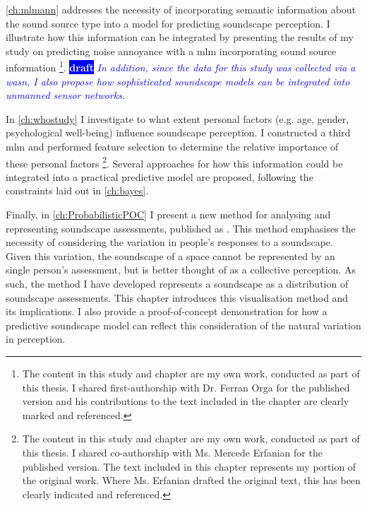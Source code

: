 \documentclass[twoside,fontsize=12pt,titlepage,chapterprefix=true
]{scrbook}
\newcommand{\remark}[3]{%
    {\colorbox{#2}{\sffamily\scriptsize\bfseries\textcolor{white}{#1}}}
    {\sffamily\small\itshape\textcolor{#2}{#3}}
}
\newcommand{\draft}[1]{\remark{draft}{blue}{#1}}
\begin{document}
\cref{ch:mlmann} addresses the necessity of incorporating semantic information about the sound source type into a model for predicting soundscape perception. I illustrate how this information can be integrated by presenting the results of my study on predicting noise annoyance with a \gls{mlm} incorporating sound source information \citep{Orga2021Multilevel}\footnote{The content in this study and chapter are my own work, conducted as part of this thesis. I shared first-authorship with Dr. Ferran Orga for the published version and his contributions to the text included in the chapter are clearly marked and referenced. }. \draft{In addition, since the data for this study was collected via a \gls{wasn}, I also propose how sophisticated soundscape models can be integrated into unmanned sensor networks.}

In \cref{ch:whostudy} I investigate to what extent personal factors (e.g. age, gender, psychological well-being) influence soundscape perception. I constructed a third \gls{mlm} and performed feature selection to determine the relative importance of these personal factors \citep{Erfanian2021Psychological}\footnote{The content in this study and chapter are my own work, conducted as part of this thesis. I shared co-authorship with Ms. Mercede Erfanian for the published version. The text included in this chapter represents my portion of the original work. Where Ms. Erfanian drafted the original text, this has been clearly indicated and referenced.}. Several approaches for how this information could be integrated into a practical predictive model are proposed, following the constraints laid out in \cref{ch:bayes}.

Finally, in \cref{ch:ProbabilisticPOC} I present a new method for analysing and representing soundscape assessments, published as \citet{Mitchell2022How}. This method emphasises the necessity of considering the variation in people's responses to a soundscape. Given this variation, the soundscape of a space cannot be represented by an single person's assessment, but is better thought of as a collective perception. As such, the method I have developed represents a soundscape as a distribution of soundscape assessments. This chapter introduces this visualisation method and its implications. I also provide a proof-of-concept demonstration for how a predictive soundscape model can reflect this consideration of the natural variation in perception.





\end{document}

